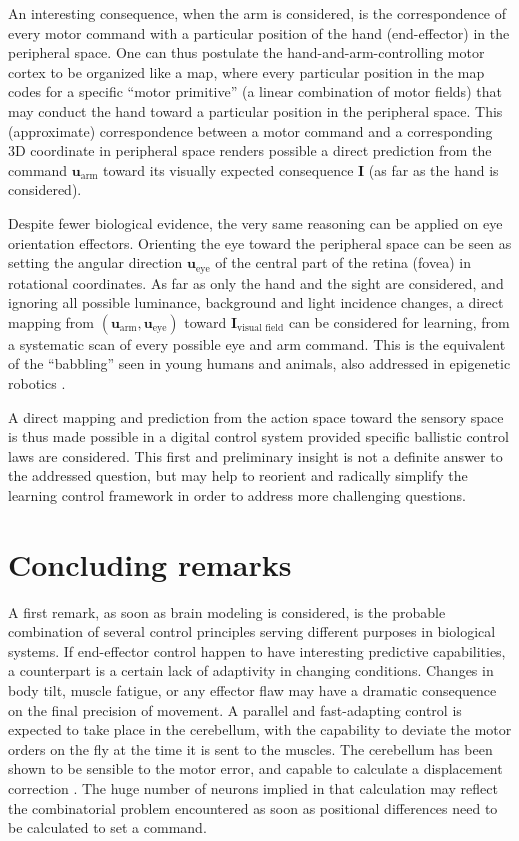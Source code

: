 \documentclass[11pt]{article}
\begin{document}
 
An interesting consequence, when the arm is considered, is the correspondence of every motor command with a particular position of the hand (end-effector) in the peripheral space. 
One can thus postulate the hand-and-arm-controlling motor cortex to be organized like a map, where every particular position in the map codes for a specific ``motor primitive'' (a linear combination of motor fields) that may conduct the hand toward a particular position in the peripheral space.
This (approximate) correspondence between a  motor command and a corresponding 3D coordinate in peripheral space renders  possible a direct prediction from the command $\boldsymbol{u}_\text{arm}$ toward its visually expected consequence $\boldsymbol{I}$ (as far as the hand is considered).

Despite fewer biological evidence, the very same reasoning can be applied on eye orientation effectors.  Orienting the eye toward the peripheral space can be seen as setting the angular direction $\boldsymbol{u}_\text{eye}$ of the central part of the retina (fovea) in rotational coordinates.
As far as only the hand and the sight are considered, and ignoring all possible luminance, background and light incidence changes, a direct mapping from $(\boldsymbol{u}_\text{arm}, 
	\boldsymbol{u}_\text{eye})$ toward $\boldsymbol{I}_\text{visual field}$ can be considered for learning, from a systematic scan of every possible eye and arm command. This is the equivalent of the ``babbling'' seen in young humans and animals, also addressed in epigenetic robotics . 

A direct mapping and prediction from the action space toward the sensory space is thus made possible in a digital control system provided specific ballistic control laws are considered. This first and preliminary insight is not a definite answer to the addressed question, but may help to reorient and radically simplify the learning control framework in order to address more challenging questions. 

\section{Concluding remarks}

A first remark, as soon as  brain modeling is considered, is the probable combination of several control principles serving different purposes in biological systems. 
If end-effector control happen to have interesting predictive capabilities, a counterpart is a certain lack of adaptivity in changing conditions.  Changes in body tilt, muscle fatigue, or any effector flaw may have a dramatic consequence on the final precision of movement. A parallel and fast-adapting control is expected to take place in the cerebellum, with the capability to deviate the motor orders on the fly at the time it is sent to the muscles.  The cerebellum has been shown to be sensible to the motor error, and capable to calculate a displacement correction . The huge number of neurons implied in that calculation may reflect the combinatorial problem encountered as soon as positional differences need to be calculated to set a command. 
 
\end{document}
